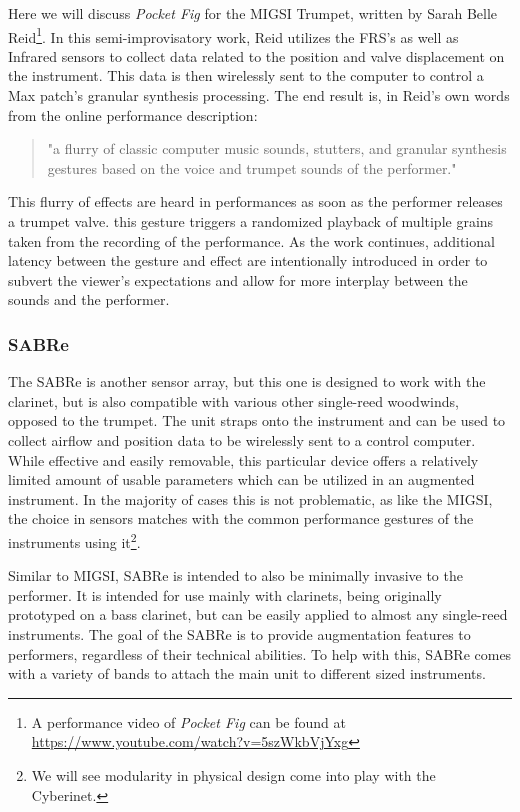 Here we will discuss \textit{Pocket Fig} for the MIGSI Trumpet, written by Sarah Belle Reid\footnote{A performance video of \textit{Pocket Fig} can be found at \url{https://www.youtube.com/watch?v=5szWkbVjYxg}}. In this semi-improvisatory work, Reid utilizes the FRS's as well as Infrared sensors to collect data related to the position and valve displacement on the instrument\cite{reid_2019}. This data is then wirelessly sent to the computer to control a Max patch's granular synthesis processing. The end result is, in Reid's own words from the online performance description: 

\begin{quote}
    "a flurry of classic computer music sounds, stutters, and granular synthesis gestures based on the voice and trumpet sounds of the performer."
\end{quote}

This flurry of effects are heard in performances as soon as the performer releases a trumpet valve. this gesture triggers a randomized playback of multiple grains taken from the recording of the performance. As the work continues, additional latency between the gesture and effect are intentionally introduced in order to subvert the viewer's expectations and allow for more interplay between the sounds and the performer\cite{reid_2019}.


\subsubsection{SABRe}

The SABRe is another sensor array, but this one is designed to work with the clarinet, but is also compatible with various other single-reed woodwinds, opposed to the trumpet. The unit straps onto the instrument and can be used to collect airflow and position data to be wirelessly sent to a control computer. While effective and easily removable, this particular device offers a relatively limited amount of usable parameters which can be utilized in an augmented instrument. In the majority of cases this is not problematic, as like the MIGSI, the choice in sensors matches with the common performance gestures of the instruments using it\footnote{We will see modularity in physical design come into play with the Cyberinet.}. 

Similar to MIGSI, SABRe is intended to also be minimally invasive to the performer. It is intended for use mainly with clarinets, being originally prototyped on a bass clarinet, but can be easily applied to almost any single-reed instruments\cite{Schiesser2012}. The goal of the SABRe is to provide augmentation features to performers, regardless of their technical abilities\cite{Schiesser2012}. To help with this, SABRe comes with a variety of bands to attach the main unit to different sized instruments. 

